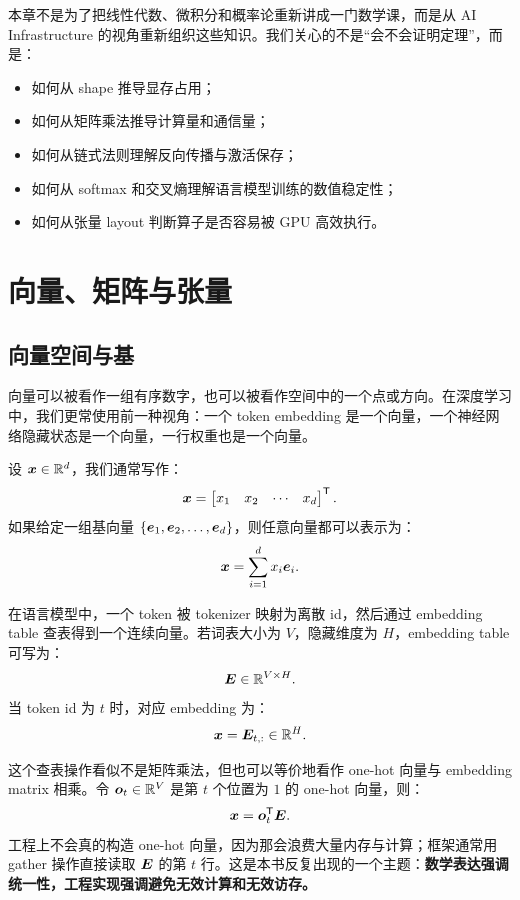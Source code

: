 本章不是为了把线性代数、微积分和概率论重新讲成一门数学课，而是从 AI Infrastructure 的视角重新组织这些知识。我们关心的不是“会不会证明定理”，而是：

\begin{itemize}
  \item 如何从 shape 推导显存占用；
  \item 如何从矩阵乘法推导计算量和通信量；
  \item 如何从链式法则理解反向传播与激活保存；
  \item 如何从 softmax 和交叉熵理解语言模型训练的数值稳定性；
  \item 如何从张量 layout 判断算子是否容易被 GPU 高效执行。
\end{itemize}

\section{向量、矩阵与张量}
\label{sec:vectors-matrices-tensors}

\subsection{向量空间与基}
\label{subsec:vector-space-basis}

向量可以被看作一组有序数字，也可以被看作空间中的一个点或方向。在深度学习中，我们更常使用前一种视角：一个 token embedding 是一个向量，一个神经网络隐藏状态是一个向量，一行权重也是一个向量。

设 $\bm{x}\in\mathbb{R}^{d}$，我们通常写作：
\[
  \bm{x}
  =
  \begin{bmatrix}
    x_1 & x_2 & \cdots & x_d
  \end{bmatrix}^{\mathsf{T}}.
\]
如果给定一组基向量 $\{\bm{e}_1,\bm{e}_2,\ldots,\bm{e}_d\}$，则任意向量都可以表示为：
\[
  \bm{x}=\sum_{i=1}^{d}x_i\bm{e}_i.
\]

在语言模型中，一个 token 被 tokenizer 映射为离散 id，然后通过 embedding table 查表得到一个连续向量。若词表大小为 $V$，隐藏维度为 $H$，embedding table 可写为：
\[
  \bm{E}\in\mathbb{R}^{V\times H}.
\]
当 token id 为 $t$ 时，对应 embedding 为：
\[
  \bm{x}=\bm{E}_{t,:}\in\mathbb{R}^{H}.
\]

这个查表操作看似不是矩阵乘法，但也可以等价地看作 one-hot 向量与 embedding matrix 相乘。令 $\bm{o}_t\in\mathbb{R}^{V}$ 是第 $t$ 个位置为 $1$ 的 one-hot 向量，则：
\[
  \bm{x}=\bm{o}_t^{\mathsf{T}}\bm{E}.
\]
工程上不会真的构造 one-hot 向量，因为那会浪费大量内存与计算；框架通常用 gather 操作直接读取 $\bm{E}$ 的第 $t$ 行。这是本书反复出现的一个主题：\textbf{数学表达强调统一性，工程实现强调避免无效计算和无效访存。}

